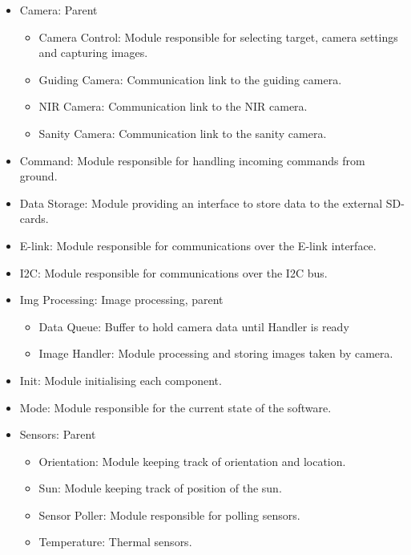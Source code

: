 \begin{itemize}

	\item Camera: Parent
		\begin{itemize}
			\item Camera Control: Module responsible for selecting target, camera settings and capturing images.
			\item Guiding Camera: Communication link to the guiding camera.
			\item NIR Camera: Communication link to the NIR camera.
			\item Sanity Camera: Communication link to the sanity camera.
		\end{itemize}

	\item Command: Module responsible for handling incoming commands from ground.

	\item Data Storage: Module providing an interface to store data to the external SD-cards.

	\item E-link: Module responsible for communications over the E-link interface.

	\item I2C: Module responsible for communications over the I2C bus.

	\item Img Processing: Image processing, parent
		\begin{itemize}
			\item Data Queue: Buffer to hold camera data until Handler is ready
			\item Image Handler: Module processing and storing images taken by camera.
		\end{itemize}

	\item Init: Module initialising each component.

	\item Mode: Module responsible for the current state of the software.

	\item Sensors: Parent
		\begin{itemize}
			\item Orientation: Module keeping track of orientation and location.
			\item Sun: Module keeping track of position of the sun.
			\item Sensor Poller: Module responsible for polling sensors.
			\item Temperature: Thermal sensors.
		\end{itemize}


\end{itemize}
